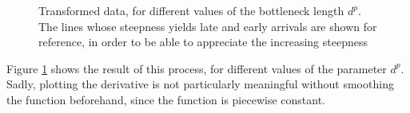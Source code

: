 \documentclass{article}
\begin{document}
\begin{figure}
  \centering
  \caption{Transformed data, for different values of the bottleneck length $d^p$. The lines whose steepness yields late and early arrivals are shown for reference, in order to be able to appreciate the increasing steepness}
  \label{fig:modifying_data}
\end{figure}

Figure \ref{fig:modifying_data} shows the result of this process, for different values of the parameter \(d^p\).
Sadly, plotting the derivative is not particularly meaningful without smoothing the function beforehand,
since the function is piecewise constant.
\end{document}
